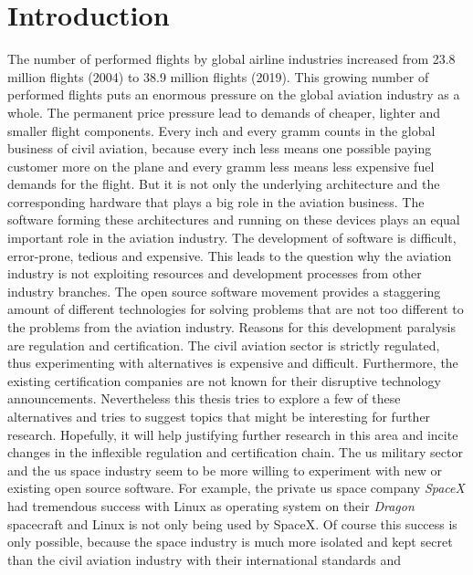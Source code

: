 \documentclass[titlepage]{report}
\begin{document}
\chapter{Introduction}\label{chapter:introduction}
\setcounter{page}{1}
The number of performed flights by global airline industries increased from 23.8 million flights (2004)
to 38.9 million flights (2019)\cite{STATISTA}. This growing number of performed flights puts an enormous
pressure on the global aviation industry as a whole. The permanent price pressure lead to demands of
cheaper, lighter and smaller flight components\cite{prisaznuk1992integrated}. Every inch and every gramm 
counts in the global business of civil aviation, because every inch less means one possible paying customer 
more on the plane and every gramm less means less expensive fuel demands for the flight. But it is not only
the underlying architecture and the corresponding hardware that plays a big role in the aviation business.
The software forming these architectures and running on these devices plays an equal important role
in the aviation industry. The development of software is difficult, error-prone, tedious and expensive. This leads
to the question why the aviation industry is not exploiting resources and development processes from other industry branches.
The open source software movement provides a staggering amount of different technologies for solving problems
that are not too different to the problems from the aviation industry. Reasons for this development paralysis
are regulation and certification. The civil aviation sector is strictly regulated, thus experimenting with alternatives
is expensive and difficult. Furthermore, the existing certification companies are not known for their disruptive
technology announcements. Nevertheless this thesis tries to explore a few of these alternatives and tries to
suggest topics that might be interesting for further research. Hopefully, it will help justifying further research
in this area and incite changes in the inflexible regulation and certification chain. The \gls{us} military sector 
and the \gls{us} space industry seem to be more willing to experiment with new or existing open source software. 
For example, the private \gls{us} space company \emph{SpaceX} had tremendous success with Linux as operating 
system on their \emph{Dragon} spacecraft\cite{gruen2012linux} and Linux is not only being used by 
SpaceX\cite{leppinen2017current}. Of course this success is only possible, because the space industry 
is much more isolated and kept secret than the civil aviation industry with their international standards and 
\end{document}
